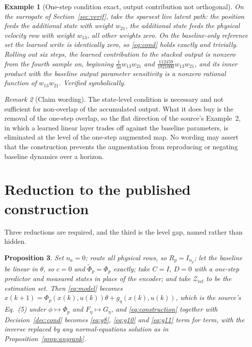 \documentclass[11pt,a4paper]{article}
\newtheorem{proposition}{Proposition}[section]
\newtheorem{example}[proposition]{Example}
\theoremstyle{remark}
\newtheorem{remark}[proposition]{Remark}
\begin{document}
\begin{example}[One-step condition exact, output contribution not orthogonal]\label{ex:nonprop}
On the surrogate of Section~\ref{sec:verif}, take the sparsest live latent path: the position feeds
the additional state with weight $w_{21}$, the additional state feeds the physical velocity row
with weight $w_{13}$, all other weights zero. On the baseline-only reference set the learned write
is \emph{identically zero}, so \eqref{eq:cond} holds exactly and trivially. Rolling out six steps,
the learned contribution to the stacked output is nonzero from the fourth sample on, beginning
$\tfrac{1}{50}w_{13}w_{21}$ and
$\tfrac{112459}{1921000}w_{13}w_{21}$, and its inner product with the baseline output parameter
sensitivity is a nonzero rational function of $w_{13}w_{21}$. \emph{Verified} symbolically.
\end{example}

\begin{remark}[Claim wording]
The state-level condition is necessary and not sufficient for non-overlap of the accumulated
output. What it does buy is the removal of the one-step overlap, so the flat direction of the
source's Example~2, in which a learned linear layer trades off against the baseline parameters, is
eliminated at the level of the one-step augmented map. No wording may assert that the construction
prevents the augmentation from reproducing or negating baseline dynamics over a horizon.
\end{remark}

\section{Reduction to the published construction}\label{sec:reduction}

Three reductions are required, and the third is the level gap, named rather than hidden.

\begin{proposition}\label{prop:reduction}
Set $n_a=0$; route all physical rows, so $R_p=I_{n_p}$; let the baseline be linear in $\theta$, so
$c=0$ and $\widetilde\Phi_p=\Phi_p$ exactly; take $C=I$, $D=0$ with a one-step predictor and
measured states in place of the encoder; and take
$\mathcal Z_{\mathrm{ref}}$ to be the estimation set. Then \eqref{eq:model} becomes
$x(k+1)=\Phi_p(x(k),u(k))\theta+g_\eta(x(k),u(k))$, which is the source's Eq.~(5) under
$\phi\mapsto\Phi_p$ and $F_\eta\mapsto G_\eta$, and \eqref{eq:construction} together with
Decision~\ref{dec:cond} becomes \eqref{eq:g8}, \eqref{eq:g10} and \eqref{eq:g11} term for term,
with the inverse replaced by any normal-equations solution as in
Proposition~\ref{prop:anyrank}.
\end{proposition}
\end{document}
